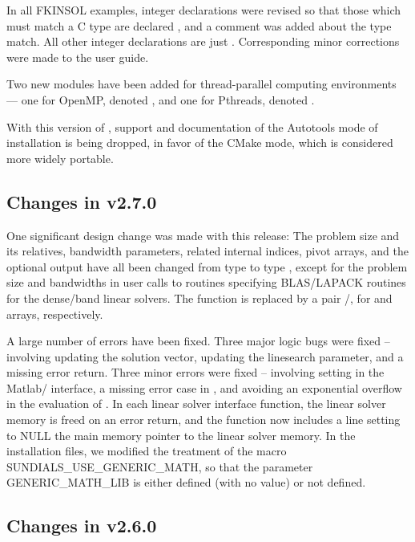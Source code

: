 In all FKINSOL examples, integer declarations were revised so that
those which must match a C type  are declared ,
and a comment was added about the type match.  All other integer
declarations are just .  Corresponding minor corrections were
made to the user guide.

Two new {\nvector} modules have been added for thread-parallel computing
environments --- one for OpenMP, denoted ,
and one for Pthreads, denoted .

With this version of {\sundials}, support and documentation of the
Autotools mode of installation is being dropped, in favor of the
CMake mode, which is considered more widely portable.

\subsection*{Changes in v2.7.0}

One significant design change was made with this release: The problem
size and its relatives, bandwidth parameters, related internal indices,
pivot arrays, and the optional output  have all been
changed from type  to type , except for the
problem size and bandwidths in user calls to routines specifying
BLAS/LAPACK routines for the dense/band linear solvers.  The function
 is replaced by a pair /,
for  and  arrays, respectively.

A large number of errors have been fixed.
Three major logic bugs were fixed -- involving updating the solution
vector, updating the linesearch parameter, and a missing error return.
Three minor errors were fixed -- involving setting  in the
Matlab/{\kinsol} interface, a missing error case in ,
and avoiding an exponential overflow in the evaluation of .
In each linear solver interface function, the linear solver memory is
freed on an error return, and the  function now includes a
line setting to NULL the main memory pointer to the linear solver memory.
In the installation files, we modified the treatment of the macro
SUNDIALS\_USE\_GENERIC\_MATH, so that the parameter GENERIC\_MATH\_LIB is
either defined (with no value) or not defined.

\subsection*{Changes in v2.6.0}

